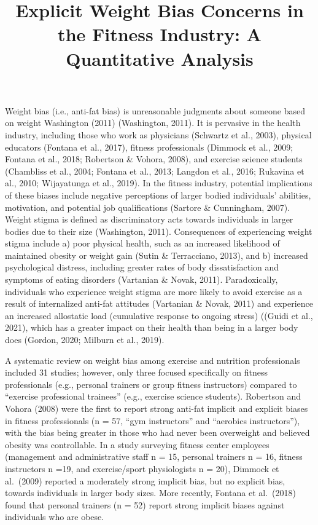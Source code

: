 \documentclass[
  jou,
  longtable,
  nolmodern,
  notxfonts,
  notimes,
  colorlinks=true,linkcolor=blue,citecolor=blue,urlcolor=blue]{apa7}
\title{\vskip 1.5cm
\bfseries Explicit Weight Bias Concerns in the Fitness Industry: A Quantitative Analysis}
\affiliation{
{Department of Kinesiology, California State University, Long Beach}}
\begin{document}
\maketitle

\setcounter{secnumdepth}{-\maxdimen} %

\setlength\LTleft{0pt}


Weight bias (i.e., anti-fat bias) is unreasonable judgments about
someone based on weight Washington (2011) (Washington, 2011). It is
pervasive in the health industry, including those who work as physicians
(Schwartz et al., 2003), physical educators (Fontana et al., 2017),
fitness professionals (Dimmock et al., 2009; Fontana et al., 2018;
Robertson \& Vohora, 2008), and exercise science students (Chambliss et
al., 2004; Fontana et al., 2013; Langdon et al., 2016; Rukavina et al.,
2010; Wijayatunga et al., 2019). In the fitness industry, potential
implications of these biases include negative perceptions of larger
bodied individuals' abilities, motivation, and potential job
qualifications (Sartore \& Cunningham, 2007). Weight stigma is defined
as discriminatory acts towards individuals in larger bodies due to their
size (Washington, 2011). Consequences of experiencing weight stigma
include a) poor physical health, such as an increased likelihood of
maintained obesity or weight gain (Sutin \& Terracciano, 2013), and b)
increased psychological distress, including greater rates of body
dissatisfaction and symptoms of eating disorders (Vartanian \& Novak,
2011). Paradoxically, individuals who experience weight stigma are more
likely to avoid exercise as a result of internalized anti-fat attitudes
(Vartanian \& Novak, 2011) and experience an increased allostatic load
(cumulative response to ongoing stress) ((Guidi et al., 2021), which has
a greater impact on their health than being in a larger body does
(Gordon, 2020; Milburn et al., 2019).

A systematic review on weight bias among exercise and nutrition
professionals included 31 studies; however, only three focused
specifically on fitness professionals (e.g., personal trainers or group
fitness instructors) compared to ``exercise professional trainees''
(e.g., exercise science students). Robertson and Vohora (2008) were the
first to report strong anti-fat implicit and explicit biases in fitness
professionals (n = 57, ``gym instructors'' and ``aerobics
instructors''), with the bias being greater in those who had never been
overweight and believed obesity was controllable. In a study surveying
fitness center employees (management and administrative staff n = 15,
personal trainers n = 16, fitness instructors n =19, and exercise/sport
physiologists n = 20), Dimmock et al.~(2009) reported a moderately
strong implicit bias, but no explicit bias, towards individuals in
larger body sizes. More recently, Fontana et al.~(2018) found that
personal trainers (n = 52) report strong implicit biases against
individuals who are obese.
\end{document}
